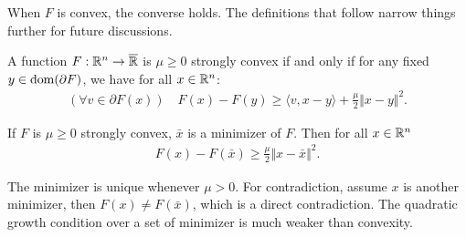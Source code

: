 \documentclass[12pt]{article}
\begin{document}
        When $F$ is convex, the converse holds. 
        The definitions that follow narrow things further for future discussions. 
        \begin{definition}\label{def:s-cnvx}
            A function $F:\mathbb R^n \rightarrow \overline {\mathbb R}$ is $\mu \ge 0$ strongly convex if and only if for any fixed $y \in \operatorname{dom}(\partial F)$, we have for all $x\in \mathbb R^n$: 
            \begin{align*}
                (\forall v \in \partial F(x))\quad 
                F(x) - F(y) \ge \langle v, x - y\rangle + \frac{\mu}{2}\Vert x - y\Vert^2. 
            \end{align*}
        \end{definition}
        \begin{lemma}\label{lemma:q-growth}
            If $F$ is $\mu \ge 0$ strongly convex, $\bar x$ is a minimizer of $F$. 
            Then for all $x \in \mathbb R^n$
            \begin{align*}
                F(x) - F(\bar x) \ge \frac{\mu}{2}\Vert x - \bar x\Vert^2. 
            \end{align*}
        \end{lemma}
        \begin{remark}
            The minimizer is unique whenever $\mu > 0$. 
            For contradiction, assume $x$ is another minimizer, then $F(x) \neq F(\bar x)$, which is a direct contradiction. 
            The quadratic growth condition over a set of minimizer is much weaker than convexity. 
        \end{remark}
        
\end{document}
